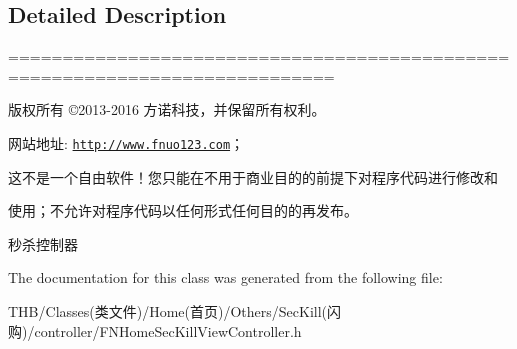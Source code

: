 \subsection{Detailed Description}
============================================================================

版权所有 ©2013-\/2016 方诺科技，并保留所有权利。

网站地址\+: \href{http://www.fnuo123.com}{\tt http\+://www.\+fnuo123.\+com}； 



这不是一个自由软件！您只能在不用于商业目的的前提下对程序代码进行修改和

使用；不允许对程序代码以任何形式任何目的的再发布。 



秒杀控制器 

The documentation for this class was generated from the following file\+:\begin{DoxyCompactItemize}
\item 
T\+H\+B/\+Classes(类文件)/\+Home(首页)/\+Others/\+Sec\+Kill(闪购)/controller/F\+N\+Home\+Sec\+Kill\+View\+Controller.\+h\end{DoxyCompactItemize}
